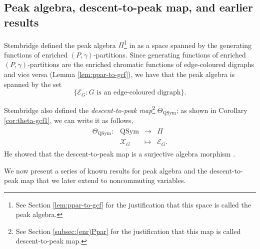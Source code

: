 \documentclass[11pt]{amsart}
\numberwithin{equation}{section}
\newcommand{\QSym}{\mathrm{QSym}}
\newcommand{\scrX}{{\mathscr{X}}}
\newcommand{\scrE}{{\mathscr{E}}}
\begin{document}
	



\subsection{Peak algebra, descent-to-peak map,  and earlier results}\label{subsec:peak-theta-results}

Stembridge defined the peak algebra $\Pi$\footnote{See Section \ref{lem:ppar-to-gcf} for the justification that this space is called the peak algebra.} in \cite{S97} as a space spanned by the generating functions of enriched $(P,\gamma)$-partitions. Since generating functions of enriched $(P,\gamma)$-partitions are the enriched chromatic functions of edge-coloured digraphs and vice versa (Lemma  \ref{lem:ppar-to-gcf}), we have that the peak algebra is spanned by the set 
$$\{\scrE_G: \text{$G$ is an edge-coloured digraph}\}.$$ 

Stembridge also defined the \emph{descent-to-peak map}\footnote{See Section \ref{subsec:(enr)Ppar} for the justification that this map is called descent-to-peak map.} $\Theta_{\QSym}$; as shown in Corollary \ref{cor:theta-gcf1}, we can write it as follows, 
 \begin{align}\label{Def:ThetaMap}
\begin{array}{cccc}
\Theta_\QSym:& \QSym & \rightarrow & \Pi\\
& \scrX_G & \mapsto & \scrE_G.
\end{array} 
\end{align} 
He showed that the descent-to-peak map is a surjective algebra morphism \cite[Theorem 3.1]{S97}.

We now present a series of known results for peak algebra and the descent-to-peak map that we later extend to noncommuting variables. 
\end{document}
